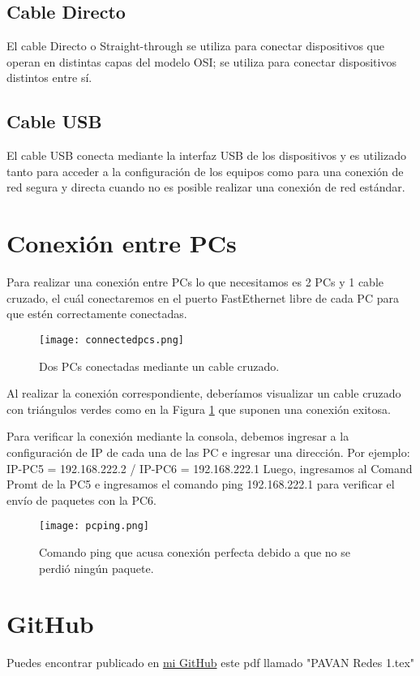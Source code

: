 \documentclass{article}
\begin{document}
\subsection{Cable Directo}
El cable Directo o Straight-through se utiliza para conectar dispositivos que operan en distintas capas del modelo OSI; se utiliza para conectar dispositivos distintos entre sí. 
\subsection{Cable USB}
El cable USB conecta mediante la interfaz USB de los dispositivos y es utilizado tanto para acceder a la configuración de los equipos como para una conexión de red segura y directa cuando no es posible realizar una conexión de red estándar.


\section{Conexión entre PCs}
Para realizar una conexión entre PCs lo que necesitamos es 2 PCs y 1 cable cruzado, el cuál conectaremos en el puerto FastEthernet libre de cada PC para que estén correctamente conectadas.

\begin{figure}[H]
\centering
\texttt{[image: connectedpcs.png]}
\caption{\label{fig:connectedpcs}Dos PCs conectadas mediante un cable cruzado.}
\end{figure}

Al realizar la conexión correspondiente, deberíamos visualizar un cable cruzado con triángulos verdes como en la Figura \ref{fig:connectedpcs} que suponen una conexión exitosa.

Para verificar la conexión mediante la consola, debemos ingresar a la configuración de IP de cada una de las PC e ingresar una dirección. Por ejemplo: IP-PC5 = 192.168.222.2 / IP-PC6 = 192.168.222.1
Luego, ingresamos al Comand Promt de la PC5 e ingresamos el comando ping 192.168.222.1 para verificar el envío de paquetes con la PC6.

\begin{figure}[H]
    \centering
    \texttt{[image: pcping.png]}
    \caption{Comando ping que acusa conexión perfecta debido a que no se perdió ningún paquete.}
    \label{fig:pcping}
\end{figure}

\section{GitHub}
Puedes encontrar publicado en \href{https://github.com/martinpavan1/redes1}{mi GitHub} este pdf llamado "PAVAN Redes 1.tex"
\end{document}
